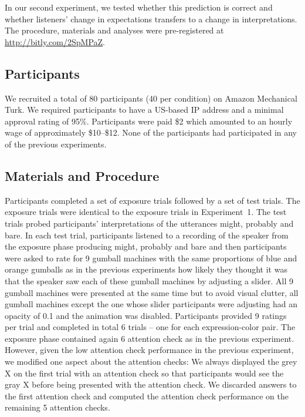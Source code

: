 \documentclass[lucida,biblatex]{sp} %
\begin{document}
In our second experiment, we tested whether this prediction is correct and whether listeners' change in expectations transfers to a change in interpretations. 
The procedure, materials and analyses were pre-registered at \url{http://bitly.com/2SpMPaZ}.

\subsection{Participants}

We recruited a total of 80 participants (40 per condition) on Amazon Mechanical Turk. We required participants to have a US-based IP address and a minimal approval rating of 95\%. Participants were paid \$2 which amounted to an hourly wage of approximately \$10--\$12. None of the participants had participated in any of the previous experiments. 

\subsection{Materials and Procedure}

Participants completed a set of exposure trials followed by a set of test trials. The exposure trials were identical to the exposure trials in Experiment~1. The test trials probed participants' interpretations of the utterances {\sc might}, {\sc probably} and {\sc bare}. In each test trial, participants listened to a recording of the speaker from the exposure phase producing {\sc might}, {\sc probably} and {\sc bare} and then participants were asked to rate for 9 gumball machines with the same proportions of blue and orange gumballs as in the previous experiments how likely they thought it was that the speaker saw each of these gumball machines by adjusting a slider. All 9 gumball machines were presented at the same time but to avoid visual clutter, all gumball machines except the one whose slider participants were adjusting had an opacity of 0.1 and the animation was disabled. Participants provided 9 ratings per trial and completed in total 6 trials -- one for each expression-color pair. The exposure phase contained again 6 attention check as in the previous experiment. However, given the low attention check performance in the previous experiment, we modified one aspect about the attention checks: We always displayed the grey X on the first trial with an attention check so that participants would see the gray X before being presented with the attention check. We discarded answers to the first attention check and computed the attention check performance on the remaining 5 attention checks.
\end{document}
